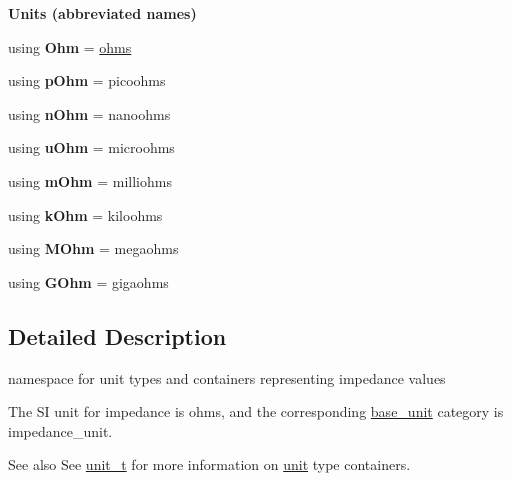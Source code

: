 \begin{Indent}{\bf Units (abbreviated names)}\par
\begin{DoxyCompactItemize}
\item 
\hypertarget{namespaceunits_1_1impedance_a8640a890f0266ca44c41e4fb238a70d9}{}using {\bfseries Ohm} = \hyperlink{structunits_1_1unit}{ohms}\label{namespaceunits_1_1impedance_a8640a890f0266ca44c41e4fb238a70d9}

\item 
\hypertarget{namespaceunits_1_1impedance_afc8b6b55426b8c7325374e5a78a830be}{}using {\bfseries p\+Ohm} = picoohms\label{namespaceunits_1_1impedance_afc8b6b55426b8c7325374e5a78a830be}

\item 
\hypertarget{namespaceunits_1_1impedance_a0de8cd2971ba7d041ee32a2ec854c80d}{}using {\bfseries n\+Ohm} = nanoohms\label{namespaceunits_1_1impedance_a0de8cd2971ba7d041ee32a2ec854c80d}

\item 
\hypertarget{namespaceunits_1_1impedance_a20f523b3fbe4ade4d28e0caed80a7355}{}using {\bfseries u\+Ohm} = microohms\label{namespaceunits_1_1impedance_a20f523b3fbe4ade4d28e0caed80a7355}

\item 
\hypertarget{namespaceunits_1_1impedance_ae23c3bec86d5dd1f73d6af6e62404ca2}{}using {\bfseries m\+Ohm} = milliohms\label{namespaceunits_1_1impedance_ae23c3bec86d5dd1f73d6af6e62404ca2}

\item 
\hypertarget{namespaceunits_1_1impedance_a865ee4f9f3d6258f5d21535dc81a986e}{}using {\bfseries k\+Ohm} = kiloohms\label{namespaceunits_1_1impedance_a865ee4f9f3d6258f5d21535dc81a986e}

\item 
\hypertarget{namespaceunits_1_1impedance_a74da7516cde4fc80d765755402dc198f}{}using {\bfseries M\+Ohm} = megaohms\label{namespaceunits_1_1impedance_a74da7516cde4fc80d765755402dc198f}

\item 
\hypertarget{namespaceunits_1_1impedance_aa76ccd63808ae5523b138bbe5241ad13}{}using {\bfseries G\+Ohm} = gigaohms\label{namespaceunits_1_1impedance_aa76ccd63808ae5523b138bbe5241ad13}

\end{DoxyCompactItemize}
\end{Indent}


\subsection{Detailed Description}
namespace for unit types and containers representing impedance values 

The S\+I unit for impedance is {\ttfamily ohms}, and the corresponding {\ttfamily \hyperlink{structunits_1_1base__unit}{base\+\_\+unit}} category is {\ttfamily impedance\+\_\+unit}. \begin{DoxySeeAlso}{See also}
See \hyperlink{classunits_1_1unit__t}{unit\+\_\+t} for more information on \hyperlink{structunits_1_1unit}{unit} type containers. 
\end{DoxySeeAlso}
